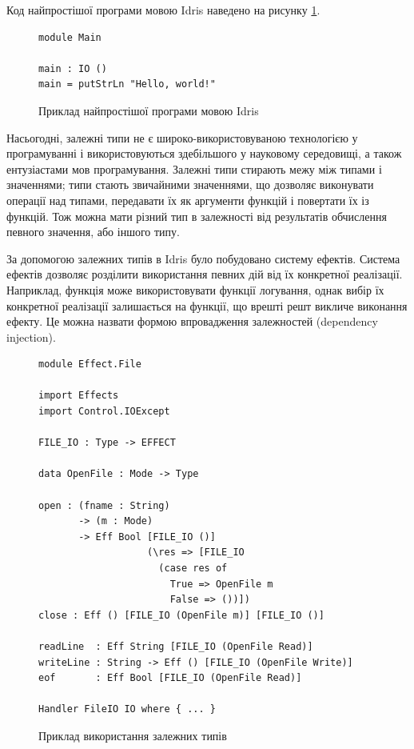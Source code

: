 \documentclass[oneside,14pt,a4paper,final]{myextreport}
\begin{document}
Код найпростішої програми мовою Idris наведено на рисунку \ref{example:idris}.

\begin{figure}[h]
  \centering
  \begin{BVerbatim}
module Main

main : IO ()
main = putStrLn "Hello, world!"
  \end{BVerbatim}
  \caption{Приклад найпростішої програми мовою Idris}\label{example:idris}
\end{figure}

Насьогодні, залежні типи не є широко-використовуваною технологією у програмуванні і використовуються здебільшого у науковому середовищі, а також ентузіастами мов програмування. Залежні типи стирають межу між типами і значеннями; типи стають звичайними значеннями, що дозволяє виконувати операції над типами, передавати їх як аргументи функцій і повертати їх із функцій. Тож можна мати різний тип в залежності від результатів обчислення певного значення, або іншого типу.

За допомогою залежних типів в Idris було побудовано систему ефектів. Система ефектів дозволяє розділити використання певних дій від їх конкретної реалізації. Наприклад, функція може використовувати функції логування, однак вибір їх конкретної реалізації залишається на функції, що врешті решт викличе виконання ефекту. Це можна назвати формою впровадження залежностей (dependency injection). 

\begin{figure}%
  \centering
  \begin{BVerbatim}
module Effect.File

import Effects
import Control.IOExcept

FILE_IO : Type -> EFFECT

data OpenFile : Mode -> Type

open : (fname : String)
       -> (m : Mode)
       -> Eff Bool [FILE_IO ()]
                   (\res => [FILE_IO
                     (case res of
                       True => OpenFile m
                       False => ())])
close : Eff () [FILE_IO (OpenFile m)] [FILE_IO ()]

readLine  : Eff String [FILE_IO (OpenFile Read)]
writeLine : String -> Eff () [FILE_IO (OpenFile Write)]
eof       : Eff Bool [FILE_IO (OpenFile Read)]

Handler FileIO IO where { ... }
  \end{BVerbatim}
  \caption{Приклад використання залежних типів}\label{idris:dependent-types}
\end{figure}
\end{document}
